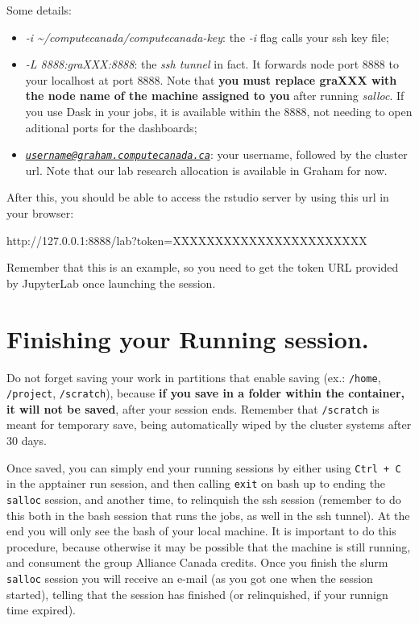 \documentclass[
]{book}
\newenvironment{Shaded}{\begin{snugshade}}{\end{snugshade}}
\newcommand{\ExtensionTok}[1]{#1}
\providecommand{\tightlist}{%
  \setlength{\itemsep}{0pt}\setlength{\parskip}{0pt}}
\begin{document}
Some details:

\begin{itemize}
\tightlist
\item
  \emph{-i \textasciitilde/computecanada/computecanada-key}: the \emph{-i} flag calls your ssh key file;
\item
  \emph{-L 8888:graXXX:8888}: the \emph{ssh tunnel} in fact. It forwards node port 8888 to your localhost at port 8888. Note that \textbf{you must replace graXXX with the node name of the machine assigned to you} after running \emph{salloc}. If you use Dask in your jobs, it is available within the 8888, not needing to open aditional ports for the dashboards;
\item
  \emph{\href{mailto:username@graham.computecanada.ca}{\nolinkurl{username@graham.computecanada.ca}}}: your username, followed by the cluster url. Note that our lab research allocation is available in Graham for now.
\end{itemize}

After this, you should be able to access the rstudio server by using this url
in your browser:

\begin{Shaded}
\begin{Highlighting}[]
\ExtensionTok{http://127.0.0.1:8888/lab?token=XXXXXXXXXXXXXXXXXXXXXXX}
\end{Highlighting}
\end{Shaded}

Remember that this is an example, so you need to get the token URL provided by JupyterLab once launching the session.

\hypertarget{finishing-your-running-session.-1}{%
\section{Finishing your Running session.}\label{finishing-your-running-session.-1}}

Do not forget saving your work in partitions that enable saving (ex.: \texttt{/home}, \texttt{/project}, \texttt{/scratch}), because \textbf{if you save in a folder within the container, it will not be saved}, after your session ends. Remember that \texttt{/scratch} is meant for temporary save, being automatically wiped by the cluster systems after 30 days.

Once saved, you can simply end your running sessions by either using \texttt{Ctrl\ +\ C} in the apptainer run session, and then calling \texttt{exit} on bash up to ending the \texttt{salloc} session, and another time, to relinquish the ssh session (remember to do this both in the bash session that runs the jobs, as well in the ssh tunnel). At the end you will only see the bash of your local machine. It is important to do this procedure, because otherwise it may be possible that the machine is still running, and consument the group Alliance Canada credits. Once you finish the slurm \texttt{salloc} session you will receive an e-mail (as you got one when the session started), telling that the session has finished (or relinquished, if your runnign time expired).

  
\end{document}
